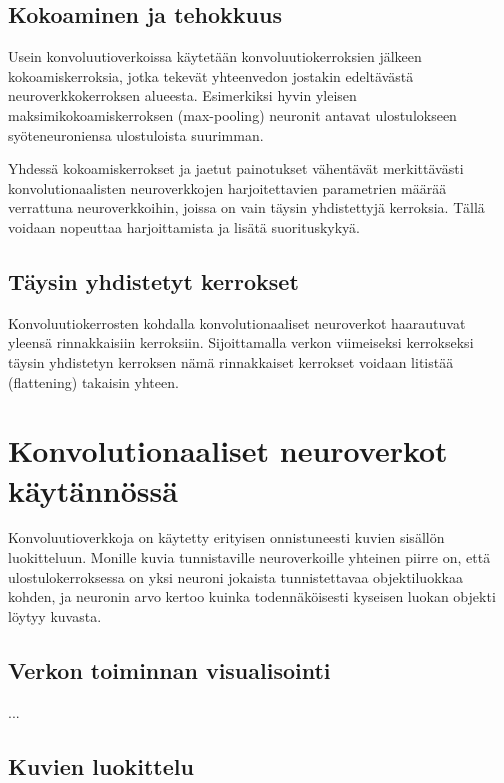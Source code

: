 \documentclass[finnish]{tktltiki2}
\theoremstyle{definition}
\theoremstyle{remark}
\begin{document}
    \subsection{Kokoaminen ja tehokkuus}
    Usein konvoluutioverkoissa käytetään konvoluutiokerroksien jälkeen kokoamiskerroksia, jotka tekevät yhteenvedon jostakin edeltävästä neuroverkkokerroksen alueesta. Esimerkiksi hyvin yleisen maksimikokoamiskerroksen (max-pooling) neuronit antavat ulostulokseen syöteneuroniensa ulostuloista suurimman.

    Yhdessä kokoamiskerrokset ja jaetut painotukset vähentävät merkittävästi konvolutionaalisten neuroverkkojen harjoitettavien parametrien määrää verrattuna neuroverkkoihin, joissa on vain täysin yhdistettyjä kerroksia. Tällä voidaan nopeuttaa harjoittamista ja lisätä suorituskykyä.

    \subsection{Täysin yhdistetyt kerrokset}
    Konvoluutiokerrosten kohdalla konvolutionaaliset neuroverkot haarautuvat yleensä rinnakkaisiin kerroksiin. Sijoittamalla verkon viimeiseksi kerrokseksi täysin yhdistetyn kerroksen nämä rinnakkaiset kerrokset voidaan litistää (flattening) takaisin yhteen.

  \section{Konvolutionaaliset neuroverkot käytännössä}
    Konvoluutioverkkoja on käytetty erityisen onnistuneesti kuvien sisällön luokitteluun. Monille kuvia tunnistaville neuroverkoille yhteinen piirre on, että ulostulokerroksessa on yksi neuroni jokaista tunnistettavaa objektiluokkaa kohden, ja neuronin arvo kertoo kuinka todennäköisesti kyseisen luokan objekti löytyy kuvasta.

  \subsection{Verkon toiminnan visualisointi}
  ... \cite{visualizing-convolutional}

  \subsection{Kuvien luokittelu}

\end{document}
